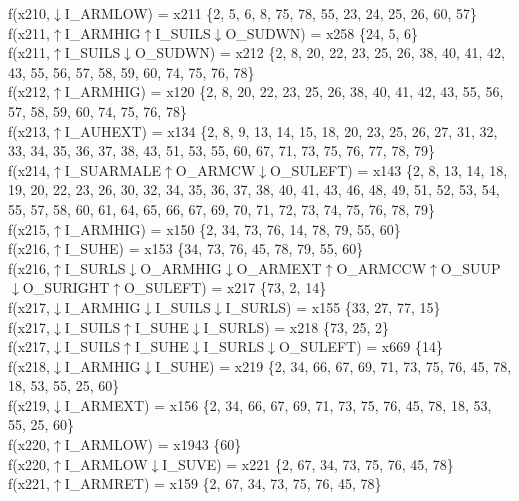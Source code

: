 f(x210,$\downarrow$I\_ARMLOW) = x211 \{2, 5, 6, 8, 75, 78, 55, 23, 24, 25, 26, 60, 57\} \\  
f(x211,$\uparrow$I\_ARMHIG$\uparrow$I\_SUILS$\downarrow$O\_SUDWN) = x258 \{24, 5, 6\} \\  
f(x211,$\uparrow$I\_SUILS$\downarrow$O\_SUDWN) = x212 \{2, 8, 20, 22, 23, 25, 26, 38, 40, 41, 42, 43, 55, 56, 57, 58, 59, 60, 74, 75, 76, 78\} \\  
f(x212,$\uparrow$I\_ARMHIG) = x120 \{2, 8, 20, 22, 23, 25, 26, 38, 40, 41, 42, 43, 55, 56, 57, 58, 59, 60, 74, 75, 76, 78\} \\  
f(x213,$\uparrow$I\_AUHEXT) = x134 \{2, 8, 9, 13, 14, 15, 18, 20, 23, 25, 26, 27, 31, 32, 33, 34, 35, 36, 37, 38, 43, 51, 53, 55, 60, 67, 71, 73, 75, 76, 77, 78, 79\} \\  
f(x214,$\uparrow$I\_SUARMALE$\uparrow$O\_ARMCW$\downarrow$O\_SULEFT) = x143 \{2, 8, 13, 14, 18, 19, 20, 22, 23, 26, 30, 32, 34, 35, 36, 37, 38, 40, 41, 43, 46, 48, 49, 51, 52, 53, 54, 55, 57, 58, 60, 61, 64, 65, 66, 67, 69, 70, 71, 72, 73, 74, 75, 76, 78, 79\} \\  
f(x215,$\uparrow$I\_ARMHIG) = x150 \{2, 34, 73, 76, 14, 78, 79, 55, 60\} \\  
f(x216,$\uparrow$I\_SUHE) = x153 \{34, 73, 76, 45, 78, 79, 55, 60\} \\  
f(x216,$\uparrow$I\_SURLS$\downarrow$O\_ARMHIG$\downarrow$O\_ARMEXT$\uparrow$O\_ARMCCW$\uparrow$O\_SUUP$\downarrow$O\_SURIGHT$\uparrow$O\_SULEFT) = x217 \{73, 2, 14\} \\  
f(x217,$\downarrow$I\_ARMHIG$\downarrow$I\_SUILS$\downarrow$I\_SURLS) = x155 \{33, 27, 77, 15\} \\  
f(x217,$\downarrow$I\_SUILS$\uparrow$I\_SUHE$\downarrow$I\_SURLS) = x218 \{73, 25, 2\} \\  
f(x217,$\downarrow$I\_SUILS$\uparrow$I\_SUHE$\downarrow$I\_SURLS$\downarrow$O\_SULEFT) = x669 \{14\} \\  
f(x218,$\downarrow$I\_ARMHIG$\downarrow$I\_SUHE) = x219 \{2, 34, 66, 67, 69, 71, 73, 75, 76, 45, 78, 18, 53, 55, 25, 60\} \\  
f(x219,$\downarrow$I\_ARMEXT) = x156 \{2, 34, 66, 67, 69, 71, 73, 75, 76, 45, 78, 18, 53, 55, 25, 60\} \\  
f(x220,$\uparrow$I\_ARMLOW) = x1943 \{60\} \\  
f(x220,$\uparrow$I\_ARMLOW$\downarrow$I\_SUVE) = x221 \{2, 67, 34, 73, 75, 76, 45, 78\} \\  
f(x221,$\uparrow$I\_ARMRET) = x159 \{2, 67, 34, 73, 75, 76, 45, 78\} \\  
